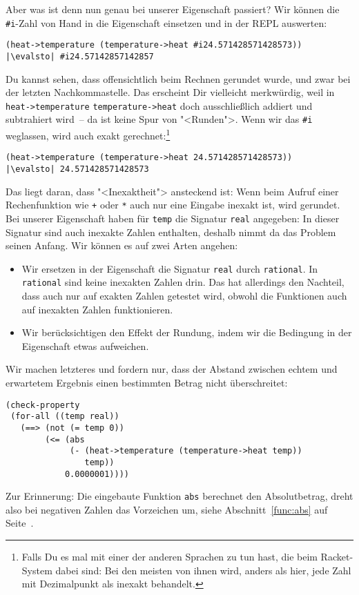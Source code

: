 Aber was ist denn nun genau bei unserer Eigenschaft passiert?  Wir
können die \lstinline{#i}-Zahl von Hand in die Eigenschaft einsetzen
und in der REPL auswerten:
%
\begin{lstlisting}
(heat->temperature (temperature->heat #i24.571428571428573))
|\evalsto| #i24.57142857142857
\end{lstlisting}
%
Du kannst sehen, dass offensichtlich beim Rechnen gerundet wurde, und
zwar bei der letzten Nachkommastelle.  Das erscheint Dir vielleicht
merkwürdig, weil in \lstinline{heat->temperature}
\lstinline{temperature->heat} doch ausschließlich addiert und
subtrahiert wird~-- da ist keine Spur von "<Runden">.  Wenn wir das
\lstinline{#i} weglassen, wird auch exakt gerechnet:\footnote{Falls Du
  es mal mit einer der anderen Sprachen zu tun hast, die beim
  Racket-System dabei sind: Bei den meisten von ihnen wird, anders als
  hier, jede Zahl mit Dezimalpunkt als inexakt behandelt.}
%
\begin{lstlisting}
(heat->temperature (temperature->heat 24.571428571428573))
|\evalsto| 24.571428571428573
\end{lstlisting}
%
Das liegt daran, dass "<Inexaktheit"> ansteckend ist: Wenn beim Aufruf
einer Rechenfunktion wie \lstinline{+} oder \lstinline{*} auch nur
eine Eingabe inexakt ist, wird gerundet.  Bei unserer Eigenschaft
haben für \lstinline{temp} die Signatur \lstinline{real} angegeben: In
dieser Signatur sind auch inexakte Zahlen enthalten, deshalb nimmt da
das Problem seinen Anfang.  Wir können es auf zwei Arten angehen:
%
\begin{itemize}
\item Wir ersetzen in der Eigenschaft die Signatur \lstinline{real}
  durch \lstinline{rational}.  In \lstinline{rational} sind keine
  inexakten Zahlen drin.  Das hat allerdings den Nachteil, dass auch
  nur auf exakten Zahlen getestet wird, obwohl die Funktionen auch auf
  inexakten Zahlen funktionieren.
\item Wir berücksichtigen den Effekt der Rundung, indem wir die Bedingung
  in der Eigenschaft etwas aufweichen.
\end{itemize}
%
Wir machen letzteres und fordern nur, dass der Abstand zwischen echtem
und erwartetem Ergebnis einen bestimmten Betrag nicht überschreitet:
%
\begin{lstlisting}
(check-property
 (for-all ((temp real))
   (==> (not (= temp 0))
        (<= (abs
             (- (heat->temperature (temperature->heat temp))
                temp))
            0.0000001))))
\end{lstlisting}
%
Zur Erinnerung: Die eingebaute Funktion \lstinline{abs} berechnet den
Absolutbetrag, dreht also bei negativen Zahlen das Vorzeichen um,
siehe Abschnitt~\ref{func:abs} auf Seite~\pageref{func:abs}.

